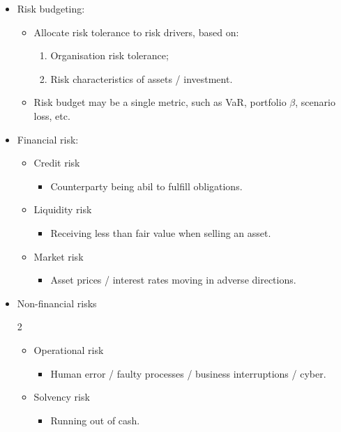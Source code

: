 \documentclass[../notes_compiled.tex]{subfiles}
\begin{document}
\begin{itemize}
\begin{itemize}
\begin{multicols}{2}
\begin{itemize}
\item Regulatory environment.
\end{itemize}
\end{multicols}
\end{itemize}
\item Risk budgeting:
\begin{itemize}
\item Allocate risk tolerance to risk drivers, based on:
\begin{enumerate}
\item Organisation risk tolerance;
\item Risk characteristics of assets / investment.
\end{enumerate}
\item Risk budget may be a single metric, such as VaR, portfolio $\beta$, scenario loss, etc.
\end{itemize}
\item Financial risk:
\begin{itemize}
\item Credit risk
\begin{itemize}
\item Counterparty being abil to fulfill obligations.
\end{itemize}
\item Liquidity risk
\begin{itemize}
\item Receiving less than fair value when selling an asset.
\end{itemize}
\item Market risk
\begin{itemize}
\item Asset prices / interest rates moving in adverse directions.
\end{itemize}
\end{itemize}
\item Non-financial risks
\begin{multicols}{2}
\begin{itemize}
\item Operational risk
\begin{itemize}
\item Human error / faulty processes / business interruptions / cyber.
\end{itemize}
\item Solvency risk
\begin{itemize}
\item Running out of cash.
\end{itemize}

\end{itemize}
\end{multicols}
\end{itemize}
\end{document}

